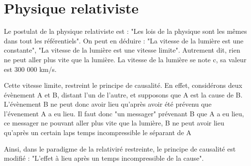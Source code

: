 
\section{Physique relativiste}

Le postulat de la physique relativiste est : "Les lois de la physique sont les mêmes dans tout les référentiels". On peut en déduire : "La vitesse de la lumière est une constante", "La vitesse de la lumière est une vitesse limite". Autrement dit, rien ne peut aller plus vite que la lumière. La vitesse de la lumière se note c, sa valeur est 300 000 km/s.

Cette vitesse limite, restreint le principe de causalité. En effet, considérons deux évènement A et B, distant l'un de l'autre, et supposons que A est la cause de B. L'évènement B ne peut donc avoir lieu qu'après avoir été prévenu que l'évenement A a eu lieu. Il faut donc "un messager" prévenant B que A a eu lieu, ce messager ne pouvant aller plus vite que la lumière, B ne peut avoir lieu qu'après un certain laps temps incompressible le séparant de A

Ainsi, dans le paradigme de la relativiré restreinte, le principe de causalité est modifié : "L'effet à lieu après un temps incompressible de la cause".








